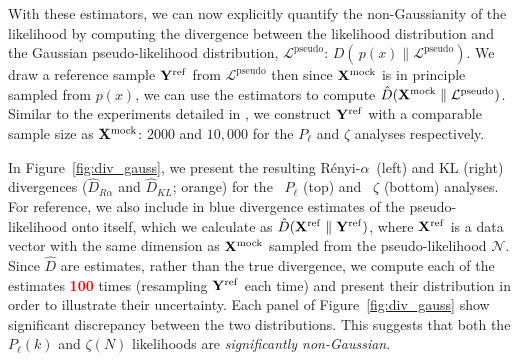 \documentclass[12pt, letterpaper, preprint]{aastex}
\newcommand{\todo}[1]{{\bf \textcolor{red}{#1}}}
\newcommand{\Xmock}{{\bf X}^\mathrm{mock}}
\newcommand{\Xref}{{\bf X}^\mathrm{ref}}
\newcommand{\Yref}{{\bf Y}^\mathrm{ref}}
\newcommand{\Ralpha}{R\'enyi-$\alpha$}
\newcommand{\Beut}{\citetalias{beutler2017}}
\newcommand{\Sinh}{\citetalias{sinha2017a}}
\begin{document}
With these estimators, we can now explicitly quantify the 
non-Gaussianity of the likelihood by computing the divergence 
between the likelihood distribution and the Gaussian 
pseudo-likelihood distribution, $\mathcal{L}^\mathrm{pseudo}$:
$D(\, p(x) \parallel \mathcal{L}^\mathrm{pseudo})$.%
We draw a reference sample ${\bf Y}^\mathrm{ref}$ from 
$\mathcal{L}^\mathrm{pseudo}$ then %
since $\Xmock$ is in principle sampled from $p(x)$, we can use the 
estimators to compute $\hat{D}(\Xmock \parallel \mathcal{L}^\mathrm{pseudo})$.
Similar to the experiments detailed in \cite{poczos2012}, 
we construct ${\bf Y}^\mathrm{ref}$ with a comparable sample size as $\Xmock$: 
$2000$ and $10,000$ for the $P_\ell$ and $\zeta$ analyses respectively. 

In Figure~\ref{fig:div_gauss}, we present the resulting \Ralpha~(left) 
and KL (right) divergences ($\hat{D}_{R\alpha}$ and $\hat{D}_{KL}$; orange) 
for the \Beut~$P_\ell$ (top) and \Sinh~$\zeta$ (bottom) analyses.
For reference, we also include in blue divergence 
estimates of the pseudo-likelihood onto itself, which we calculate as 
$\hat{D}(\Xref \parallel \Yref)$, where $\Xref$ is a data vector with 
the same dimension as $\Xmock$ sampled from the pseudo-likelihood 
$\mathcal{N}$. Since $\hat{D}$ are estimates, rather than the true divergence, 
we compute each of the estimates \todo{100} times (resampling 
$\Yref$ each time) and present their distribution in order to 
illustrate their uncertainty.
Each panel of Figure~\ref{fig:div_gauss} show significant 
discrepancy between the two distributions. This suggests that both 
the $P_\ell(k)$ and $\zeta(N)$ likelihoods are \emph{significantly 
non-Gaussian}. 
\end{document}
